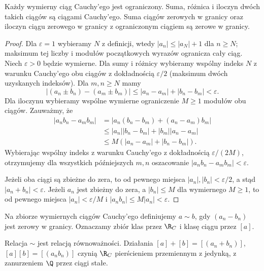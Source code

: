 \begin{lemat}
\label{ma1:lem:cauchy-algebra}
Każdy wymierny ciąg Cauchy'ego jest ograniczony. Suma, różnica i iloczyn dwóch takich ciągów są ciągami Cauchy'ego. Suma ciągów zerowych w granicy oraz iloczyn ciągu zerowego w granicy z ograniczonym ciągiem są zerowe w granicy.
\end{lemat}
\begin{proof}
Dla $\varepsilon=1$ wybieramy $N$ z definicji, wtedy $|a_n|\le|a_N|+1$ dla $n\ge N$; maksimum tej liczby i modułów początkowych wyrazów ogranicza cały ciąg. Niech $\varepsilon>0$ będzie wymierne. Dla sumy i różnicy wybieramy wspólny indeks $N$ z warunku Cauchy'ego obu ciągów z dokładnością $\varepsilon/2$ (maksimum dwóch uzyskanych indeksów). Dla $m,n\ge N$ mamy
\[
 |(a_n\pm b_n)-(a_m\pm b_m)|
 \le|a_n-a_m|+|b_n-b_m|<\varepsilon.
\]
Dla iloczynu wybieramy wspólne wymierne ograniczenie $M\ge1$ modułów obu ciągów. Zauważmy, że
\[
\begin{aligned}
 |a_nb_n-a_mb_m|
 &=|a_n(b_n-b_m)+(a_n-a_m)b_m|\\
 &\le |a_n||b_n-b_m|+|b_m||a_n-a_m|\\
 &\le M(|a_n-a_m|+|b_n-b_m|).
\end{aligned}
\]
Wybierając wspólny indeks z warunku Cauchy'ego z dokładnością $\varepsilon/(2M)$, otrzymujemy dla wszystkich późniejszych $m,n$ oszacowanie $|a_nb_n-a_mb_m|<\varepsilon$.

Jeżeli oba ciągi są zbieżne do zera, to od pewnego miejsca $|a_n|,|b_n|<\varepsilon/2$, a stąd $|a_n+b_n|<\varepsilon$. Jeżeli $a_n$ jest zbieżny do zera, a $|b_n|\le M$ dla wymiernego $M\ge1$, to od pewnego miejsca $|a_n|<\varepsilon/M$ i $|a_nb_n|\le M|a_n|<\varepsilon$.
\end{proof}
\begin{definicja}
Na zbiorze wymiernych ciągów Cauchy'ego definiujemy $a\sim b$, gdy $(a_n-b_n)$ jest zerowy w granicy. Oznaczamy zbiór klas przez $\R_C$ i klasę ciągu przez $[a]$.
\end{definicja}
\begin{twierdzenie}
\label{ma1:thm:cauchy-ring}
Relacja $\sim$ jest relacją równoważności. Działania $[a]+[b]=[(a_n+b_n)]$, $[a][b]=[(a_nb_n)]$ czynią $\R_C$ pierścieniem przemiennym z jedynką, z zanurzeniem $\Q$ przez ciągi stałe.
\end{twierdzenie}
